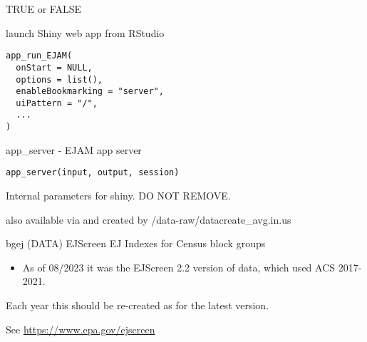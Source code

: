 \documentclass[a4paper]{book}
\begin{document}
%
\begin{Value}
TRUE or FALSE
\end{Value}
%
\begin{SeeAlso}\relax
{} 
\end{SeeAlso}
%
\begin{Description}\relax
launch Shiny web app from RStudio
\end{Description}
%
\begin{Usage}
\begin{verbatim}
app_run_EJAM(
  onStart = NULL,
  options = list(),
  enableBookmarking = "server",
  uiPattern = "/",
  ...
)
\end{verbatim}
\end{Usage}
%
\begin{Description}\relax
app\_server - EJAM app server
\end{Description}
%
\begin{Usage}
\begin{verbatim}
app_server(input, output, session)
\end{verbatim}
\end{Usage}
%
\begin{Arguments}
\begin{ldescription}
\item[\code{input, output, session}] Internal parameters for shiny.
DO NOT REMOVE.
\end{ldescription}
\end{Arguments}
%
\begin{Description}\relax
also available via  and created by /data-raw/datacreate\_avg.in.us
\end{Description}
%
\begin{Description}\relax
bgej (DATA) EJScreen EJ Indexes for Census block groups
\end{Description}
%
\begin{Details}\relax
\begin{itemize}

\item{} As of 08/2023 it was the EJScreen 2.2 version of data, which used ACS 2017-2021.

\end{itemize}


Each year this should be re-created as for the latest version.

See \url{https://www.epa.gov/ejscreen}
\end{Details}
\end{document}
